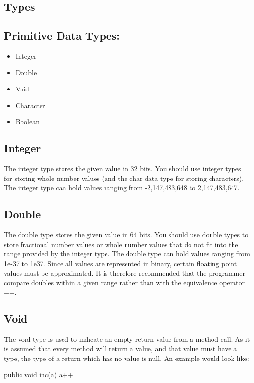 \begin{homeworkProblem}
	\chapter{Types}
	\section{Primitive Data Types:}
	\begin{itemize}
		\item Integer
		\item Double
		\item Void
		\item Character
		\item Boolean
	\end{itemize}
	
	\section{Integer}
	The integer type stores the given value in 32 bits. You should use integer types for storing whole number values (and the char data type for storing characters). The integer type can hold values ranging from -2,147,483,648 to 2,147,483,647.
	
	\section{Double}
	
	The double type stores the given value in 64 bits. You should use double types to store fractional number values or whole number values that do not fit into the range provided by the integer type. The double type can hold values ranging from 1e-37 to 1e37. Since all values are represented in binary, certain floating point values must be approximated. It is therefore recommended that the programmer compare doubles within a given range rather than with the equivalence operator ==.
	
	\section{Void}
	
	The void type is used to indicate an empty return value from a method call. As it is assumed that every method will return a value, and that value must have a type, the type of a return which has no value is null. An example would look like:
	
	public void inc(a) { a++ }
	

\end{homeworkProblem}
